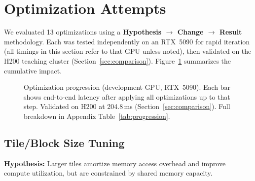 \documentclass{article}
\begin{document}
\section{Optimization Attempts}\label{sec:optimization}

We evaluated 13 optimizations using a \textbf{Hypothesis $\to$ Change $\to$ Result} methodology.  Each was tested independently on an RTX~5090 for rapid iteration (all timings in this section refer to that GPU unless noted), then validated on the H200 teaching cluster (Section~\ref{sec:comparison}).
Figure~\ref{fig:progression} summarizes the cumulative impact.

\begin{figure}[h]
\centering
{}
\vspace{-1ex}
\caption{Optimization progression (development GPU, RTX~5090).  Each bar shows end-to-end latency after applying all optimizations up to that step.  Validated on H200 at 204.8\,ms (Section~\ref{sec:comparison}).  Full breakdown in Appendix Table~\ref{tab:progression}.}
\label{fig:progression}
\end{figure}

\subsection{Tile/Block Size Tuning}

\textbf{Hypothesis:} Larger tiles amortize memory access overhead and improve compute utilization, but are constrained by shared memory capacity.
\end{document}
